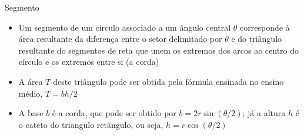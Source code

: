 \begin{frame}[fragile]{Segmento}

    \begin{itemize}
        \item Um segmento de um círculo associado a um ângulo central $\theta$ corresponde à área 
            resultante da diferença entre o setor delimitado por $\theta$ e do triângulo 
            resultante do segmentos de reta que unem os extremos dos arcos ao centro do círculo e 
            os extremos entre si (a corda)

        \item A área $T$ deste triângulo pode ser obtida pela fórmula ensinada no ensino médio,
            $T = bh/2$

        \item A base $b$ é a corda, que pode ser obtido por
            $b = 2r\sin(\theta/2)$; já a altura $h$ é o cateto do triangulo retângulo, ou seja,
            $h = r\cos(\theta/2)$

        \begin{figure}
            \centering
        \end{figure}
 
    \end{itemize}

\end{frame}

